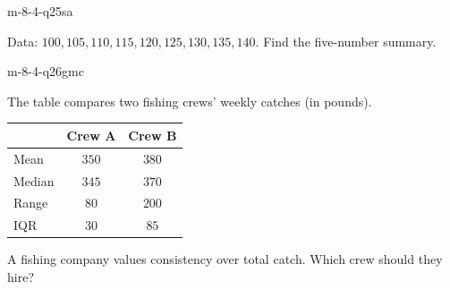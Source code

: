 \begin{practiceQuestion}{m-8-4-q25}{sa}
\begin{questionText}
Data: $100, 105, 110, 115, 120, 125, 130, 135, 140$. Find the five-number summary.
\end{questionText}
\end{practiceQuestion}


\begin{practiceQuestion}{m-8-4-q26}{gmc}
\begin{questionText}
The table compares two fishing crews' weekly catches (in pounds).

\begin{center}
\begin{tabular}{|l|c|c|}
\hline
 & \textbf{Crew A} & \textbf{Crew B} \\
\hline
Mean & $350$ & $380$ \\
\hline
Median & $345$ & $370$ \\
\hline
Range & $80$ & $200$ \\
\hline
IQR & $30$ & $85$ \\
\hline
\end{tabular}
\end{center}

A fishing company values consistency over total catch. Which crew should they hire?
\end{questionText}
\end{practiceQuestion}


